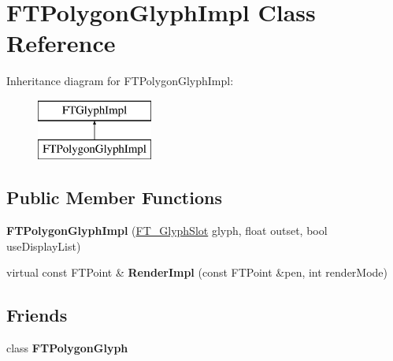 \hypertarget{class_f_t_polygon_glyph_impl}{\section{F\-T\-Polygon\-Glyph\-Impl Class Reference}
\label{class_f_t_polygon_glyph_impl}
}
Inheritance diagram for F\-T\-Polygon\-Glyph\-Impl\-:\begin{figure}[H]
\begin{center}
\leavevmode
\includegraphics[height=2.000000cm]{class_f_t_polygon_glyph_impl}
\end{center}
\end{figure}
\subsection*{Public Member Functions}
\begin{DoxyCompactItemize}
\item 
\hypertarget{class_f_t_polygon_glyph_impl_ab302277a0e76adf9570f1ef9f9ae851f}{{\bfseries F\-T\-Polygon\-Glyph\-Impl} (\hyperlink{struct_f_t___glyph_slot_rec__}{F\-T\-\_\-\-Glyph\-Slot} glyph, float outset, bool use\-Display\-List)}\label{class_f_t_polygon_glyph_impl_ab302277a0e76adf9570f1ef9f9ae851f}

\item 
\hypertarget{class_f_t_polygon_glyph_impl_af689ff9cecc738d292d494bf83adca39}{virtual const F\-T\-Point \& {\bfseries Render\-Impl} (const F\-T\-Point \&pen, int render\-Mode)}\label{class_f_t_polygon_glyph_impl_af689ff9cecc738d292d494bf83adca39}

\end{DoxyCompactItemize}
\subsection*{Friends}
\begin{DoxyCompactItemize}
\item 
\hypertarget{class_f_t_polygon_glyph_impl_a0e33f7bc34e1097f8f9adcb6252d1bc0}{class {\bfseries F\-T\-Polygon\-Glyph}}\label{class_f_t_polygon_glyph_impl_a0e33f7bc34e1097f8f9adcb6252d1bc0}

\end{DoxyCompactItemize}

